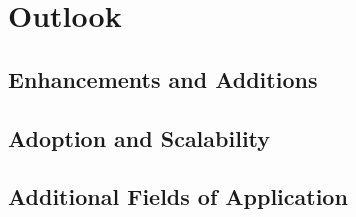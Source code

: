 
\chapter{Outlook}

\section{Enhancements and Additions}

\section{Adoption and Scalability}

\section{Additional Fields of Application}

